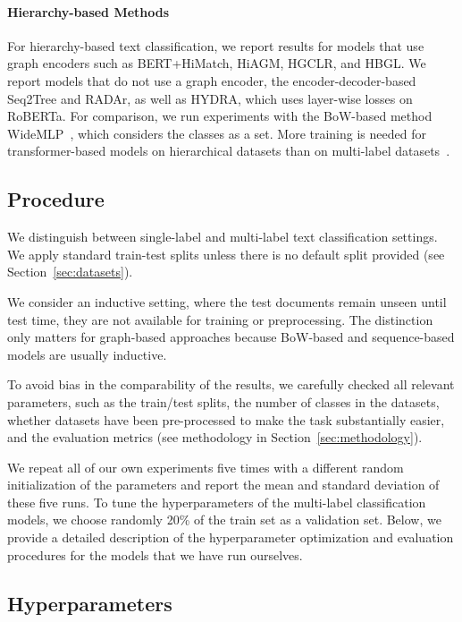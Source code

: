 \documentclass[lettersize,journal]{IEEEtran}
\begin{document}
\paragraph{Hierarchy-based Methods}
\label{sec:hiagm}
\label{sec:Hierarchy-based-Text-Classification}
For hierarchy-based text classification, we report results for models that use graph encoders such as BERT+HiMatch, HiAGM, HGCLR, and HBGL.
We report models that do not use a graph encoder, \eg the encoder-decoder-based Seq2Tree and RADAr, as well as HYDRA, which uses layer-wise losses on RoBERTa.
For comparison, we run experiments with the BoW-based method WideMLP~\cite{galkescherp-acl2022}, which considers the classes as a set.
More training is needed for transformer-based models on hierarchical datasets than on multi-label datasets~\cite{hydra}.

\subsection{Procedure}

We distinguish between single-label and multi-label text classification settings.
We apply standard train-test splits unless there is no default split provided (see Section~\ref{sec:datasets}).

We consider an inductive setting, where the test documents remain unseen until test time, \ie they are not available for training or preprocessing. The distinction only matters for graph-based approaches because BoW-based and sequence-based models are usually inductive.

To avoid bias in the comparability of the results, we carefully checked all relevant parameters, such as the train/test splits, the number of classes in the datasets, whether datasets have been pre-processed to make the task substantially easier, and the evaluation metrics (see methodology in Section~\ref{sec:methodology}). 

We repeat all of our own experiments five times with a different random initialization of the parameters and report the mean and standard deviation of these five runs.
To tune the hyperparameters of the multi-label classification models, we choose randomly 20\% of the train set as a validation set. 
Below, we provide a detailed description of the hyperparameter optimization and evaluation procedures for the models that we have run ourselves.

\subsection{Hyperparameters}
\end{document}
